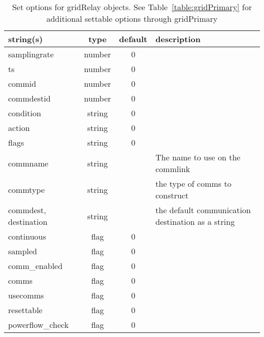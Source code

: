 \begin{table}[ht]
\centering
\begin{tabular}{p{5cm} c c p{7cm}}
\hline
string(s) & type & default & description \\
\hline
samplingrate & number & 0 & \\
ts & number & 0 & \\
commid & number & 0 & \\
commdestid & number & 0 & \\
condition & string & 0 & \\
action & string & 0 & \\
flags & string & 0 & \\
commname & string &  & The name to use on the commlink\\
commtype & string &  & the type of comms to construct\\
commdest, destination & string &  & the default communication destination as a string\\
continuous & flag & 0 & \\
sampled & flag & 0 & \\
comm\_enabled & flag & 0 & \\
comms & flag & 0 & \\
usecomms & flag & 0 & \\
resettable & flag & 0 & \\
powerflow\_check & flag & 0 & \\
\hline
\end{tabular}
\caption{Set options for gridRelay objects. See Table~\ref{table:gridPrimary} for additional settable options through gridPrimary}
\label{table:gridRelay}
\end{table}

